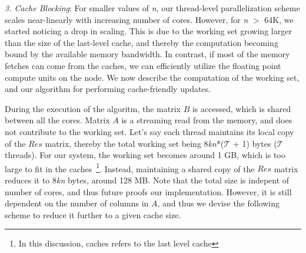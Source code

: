      \vspace*{0.05in}
     {\it{3. Cache Blocking}}: For smaller values of {\it{n}}, our
     thread-level parallelization scheme scales near-linearly with
     increasing number of cores. However, for {\it{n}} $>$ 64K, we
     started noticing a drop in scaling. This is due to the working
     set growing larger than the size of the last-level cache, and
     thereby the computation becoming bound by the available memory
     bandwidth. In contrast, if most of the memory fetches can come
     from the caches, we can efficiently  utilize the floating
     point compute units on the node. We now
     describe the computation of the working set, and our algorithm
     for performing cache-friendly updates.

     During the execution of the algoritm, the matrix $B$ is
     accessed, which is shared between all the cores. Matrix $A$ is a
     streaming read from the memory, and does not contribute to
     the working set. Let's say each thread maintains  its local copy
     of the $Res$ matrix, thereby the total working set being
     8{\it{kn}}*($\mathcal{T}$ + 1) bytes ($\mathcal{T}$ threads). For
     our system,  
     the working set becomes
     around 1 GB, which is too large to fit in the
     caches~\footnote{In this discussion, caches refers to the last
     level cache}. Instead,
     maintaining a shared copy of the $Res$ matrix reduces it to
     8{\it{kn}} bytes, around 128 MB. Note that the
     total size is indepent of number of cores, and thus future
     proofs our implementation.
     However, it is still dependent on  the
     number of columns in $A$, and thus we devise the
     following scheme to reduce it further to a given cache size.

